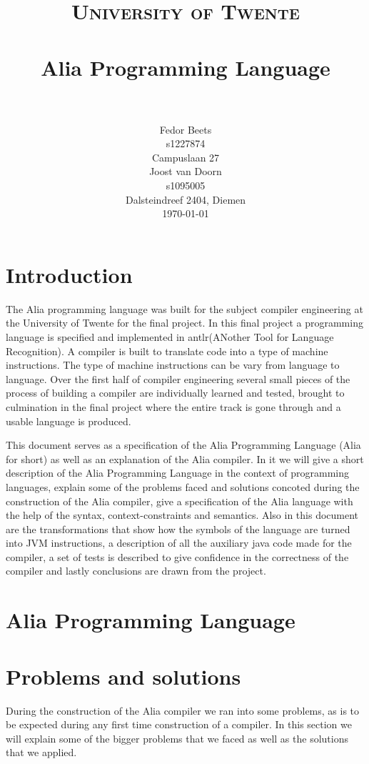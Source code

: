 \documentclass[paper=a4, fontsize=11pt]{article}
\title{
		\usefont{OT1}{bch}{b}{n}
		\normalfont \normalsize \textsc{University of Twente} \\ [25pt]
		\horrule{0.5pt} \\[0.4cm]
		\huge Alia Programming Language \\
		\horrule{2pt} \\[0.5cm]
}
\author{
		\normalfont 								\normalsize
        Fedor Beets\\[-3pt]						\small
        s1227874\\[-3pt]        				\small
        Campuslaan 27\\[8pt]					\normalsize
        Joost van Doorn\\[-3pt]					\small
        s1095005\\[-3pt]						\small
        Dalsteindreef 2404, Diemen\\[8pt]			\normalsize
        \today
}
\date{}
\numberwithin{equation}{section}		%
\numberwithin{figure}{section}			%
\numberwithin{table}{section}				%
\begin{document}
\maketitle
\newpage
\section*{Introduction}
The Alia programming language was built for the subject compiler engineering at the University of Twente for the final project. In this final project a programming language is specified and implemented in antlr(ANother Tool for Language Recognition). A compiler is built to translate code into a type of machine instructions. The type of machine instructions can be vary from language to language. Over the first half of compiler engineering several small pieces of the process of building a compiler are individually learned and tested, brought to culmination in the final project where the entire track is gone through and a usable language is produced. 

This document serves as a specification of the Alia Programming Language (Alia for short) as well as an explanation of the Alia compiler. In it we will give a short description of the Alia Programming Language in the context of programming languages, explain some of the problems faced and solutions concoted during the construction of the Alia compiler,  give a specification of the Alia language with the help of the syntax, context-constraints and semantics. Also in this document are the transformations that show how the symbols of the language are turned into JVM instructions, a description of all the auxiliary java code made for the compiler, a set of tests is described to give confidence in the correctness of the compiler and lastly conclusions are drawn from the project.

\section{Alia Programming Language}


\section{Problems and solutions}
During the construction of the Alia compiler we ran into some problems, as is to be expected during any first time construction of a compiler. In this section we will explain some of the bigger problems that we faced as well as the solutions that we applied.
\end{document}
